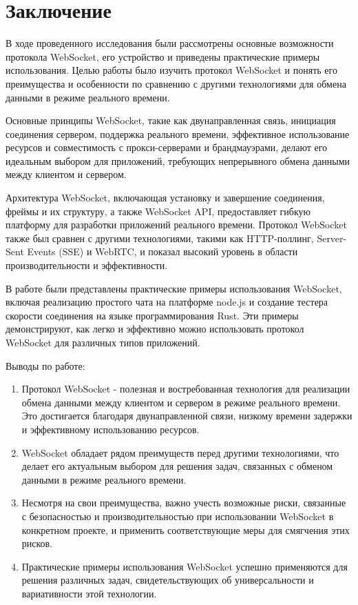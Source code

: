 \chapter*{Заключение}

В ходе проведенного исследования были рассмотрены основные возможности протокола WebSocket, его устройство и приведены практические примеры использования. Целью работы было изучить протокол WebSocket и понять его преимущества и особенности по сравнению с другими технологиями для обмена данными в режиме реального времени.

Основные принципы WebSocket, такие как двунаправленная связь, инициация соединения сервером, поддержка реального времени, эффективное использование ресурсов и совместимость с прокси-серверами и брандмауэрами, делают его идеальным выбором для приложений, требующих непрерывного обмена данными между клиентом и сервером.

Архитектура WebSocket, включающая установку и завершение соединения, фреймы и их структуру, а также WebSocket API, предоставляет гибкую платформу для разработки приложений реального времени. Протокол WebSocket также был сравнен с другими технологиями, такими как HTTP-поллинг, Server-Sent Events (SSE) и WebRTC, и показал высокий уровень в области производительности и эффективности.

В работе были представлены практические примеры использования WebSocket, включая реализацию простого чата на платформе node.js и создание тестера скорости соединения на языке программирования Rust. Эти примеры демонстрируют, как легко и эффективно можно использовать протокол WebSocket для различных типов приложений.

Выводы по работе:
\begin{enumerate}
\item Протокол WebSocket - полезная и востребованная технология для реализации обмена данными между клиентом и сервером в режиме реального времени. Это достигается благодаря двунаправленной связи, низкому времени задержки и эффективному использованию ресурсов.
\item WebSocket обладает рядом преимуществ перед другими технологиями, что делает его актуальным выбором для решения задач, связанных с обменом данными в режиме реального времени.
\item Несмотря на свои преимущества, важно учесть возможные риски, связанные с безопасностью и производительностью при использовании WebSocket в конкретном проекте, и применить соответствующие меры для смягчения этих рисков.
\item Практические примеры использования WebSocket успешно применяются для решения различных задач, свидетельствующих об универсальности и вариативности этой технологии.
\end{enumerate}

